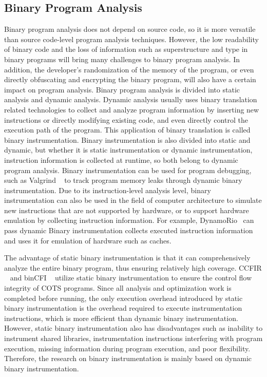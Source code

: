 \subsection{Binary Program Analysis}
Binary program analysis does not depend on source code, so it is more versatile than source code-level program analysis techniques.
However, the low readability of binary code and the loss of information such as superstructure and type in binary programs will bring many challenges to binary program analysis.
In addition, the developer's randomization of the memory of the program, or even directly obfuscating and encrypting the binary program, will also have a certain impact on program analysis.
Binary program analysis is divided into static analysis and dynamic analysis.
Dynamic analysis usually uses binary translation related technologies to collect and analyze program information by inserting new instructions or directly modifying existing code, and even directly control the execution path of the program.
This application of binary translation is called binary instrumentation.
Binary instrumentation is also divided into static and dynamic, but whether it is static instrumentation or dynamic instrumentation, instruction information is collected at runtime, so both belong to dynamic program analysis.
Binary instrumentation can be used for program debugging, such as Valgrind ~\cite{DBLP:conf/pldi/NethercoteS07} to track program memory leaks through dynamic binary instrumentation.
Due to its instruction-level analysis level, binary instrumentation can also be used in the field of computer architecture to simulate new instructions that are not supported by hardware, or to support hardware emulation by collecting instruction information.
For example, DynamoRio~\cite{DBLP:conf/vee/BrueningZA12} can pass dynamic Binary instrumentation collects executed instruction information and uses it for emulation of hardware such as caches.

The advantage of static binary instrumentation is that it can comprehensively analyze the entire binary program, thus ensuring relatively high coverage.
CCFIR ~\cite{DBLP:conf/sp/ZhangWCDSMSZ13} and binCFI ~\cite{DBLP:conf/acsac/ZhangS15} utilize static binary instrumentation to ensure the control flow integrity of COTS programs.
Since all analysis and optimization work is completed before running, the only execution overhead introduced by static binary instrumentation is the overhead required to execute instrumentation instructions, which is more efficient than dynamic binary instrumentation.
However, static binary instrumentation also has disadvantages such as inability to instrument shared libraries, instrumentation instructions interfering with program execution, missing information during program execution, and poor flexibility.
Therefore, the research on binary instrumentation is mainly based on dynamic binary instrumentation.

